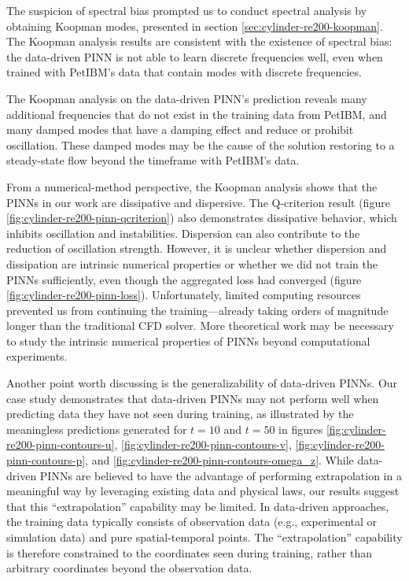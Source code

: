 The suspicion of spectral bias prompted us to conduct spectral analysis by obtaining Koopman modes, presented in section \ref{sec:cylinder-re200-koopman}.
The Koopman analysis results are consistent with the existence of spectral bias: the data-driven PINN is not able to learn discrete frequencies well, even when trained with PetIBM's data that contain modes with discrete frequencies.

The Koopman analysis on the data-driven PINN's prediction reveals many additional frequencies that do not exist in the training data from PetIBM, and many damped modes that have a damping effect and reduce or prohibit oscillation.
These damped modes may be the cause of the solution restoring to a steady-state flow beyond the timeframe with PetIBM's data.

From a numerical-method perspective, the Koopman analysis shows that the PINNs in our work are dissipative and dispersive.
The Q-criterion result (figure \ref{fig:cylinder-re200-pinn-qcriterion}) also demonstrates dissipative behavior, which inhibits oscillation and instabilities.
Dispersion can also contribute to the reduction of oscillation strength.
However, it is unclear whether dispersion and dissipation are intrinsic numerical properties or whether we did not train the PINNs sufficiently, even though the aggregated loss had converged (figure \ref{fig:cylinder-re200-pinn-loss}).
Unfortunately, limited computing resources prevented us from continuing the training---already taking orders of magnitude longer than the traditional CFD solver.
More theoretical work may be necessary to study the intrinsic numerical properties of PINNs beyond computational experiments.

Another point worth discussing is the generalizability of data-driven PINNs.
Our case study demonstrates that data-driven PINNs may not perform well when predicting data they have not seen during training, as illustrated by the meaningless predictions generated for $t = 10$ and $t = 50$ in figures \ref{fig:cylinder-re200-pinn-contours-u}, \ref{fig:cylinder-re200-pinn-contours-v}, \ref{fig:cylinder-re200-pinn-contours-p}, and \ref{fig:cylinder-re200-pinn-contours-omega_z}.
While data-driven PINNs are believed to have the advantage of performing extrapolation in a meaningful way by leveraging existing data and physical laws, our results suggest that this ``extrapolation'' capability may be limited.
In data-driven approaches, the training data typically consists of observation data (e.g., experimental or simulation data) and pure spatial-temporal points.
The ``extrapolation'' capability is therefore constrained to the coordinates seen during training, rather than arbitrary coordinates beyond the observation data.

